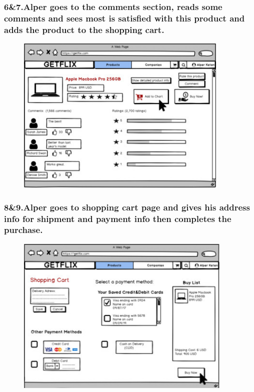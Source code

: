 \documentclass[]{article}
\begin{document}
\hypertarget{alper-goes-to-the-comments-section-reads-some-comments-and-sees-most-is-satisfied-with-this-product-and-adds-the-product-to-the-shopping-cart.}{%
    \subsubsection{6\&7.Alper goes to the comments section, reads some
        comments and sees most is satisfied with this product and adds the
        product to the shopping
        cart.}\label{alper-goes-to-the-comments-section-reads-some-comments-and-sees-most-is-satisfied-with-this-product-and-adds-the-product-to-the-shopping-cart.}}

\begin{figure}[H]
    \centering
    \includegraphics[height=3in]{./images/31.jpg}
\end{figure}

\hypertarget{alper-goes-to-shopping-cart-page-and-gives-his-address-info-for-shipment-and-payment-info-then-completes-the-purchase.}{%
    \subsubsection{8\&9.Alper goes to shopping cart page and gives his
        address info for shipment and payment info then completes the
        purchase.}\label{alper-goes-to-shopping-cart-page-and-gives-his-address-info-for-shipment-and-payment-info-then-completes-the-purchase.}}

\begin{figure}[H]
    \centering
    \includegraphics[height=3in]{./images/32.jpg}
\end{figure}
\end{document}
